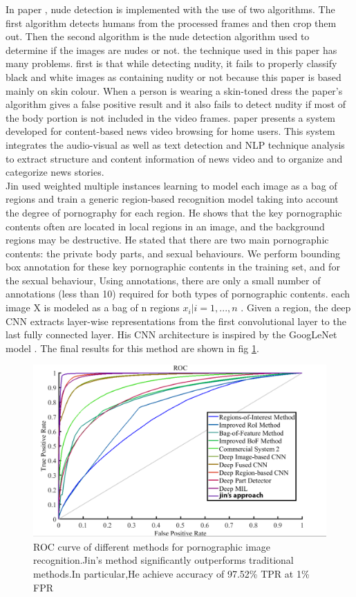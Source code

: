 \documentclass[runningheads]{llncs}
\begin{document}
In paper \cite{tofa2017inappropriate}, nude detection is implemented with the use of two algorithms. The first algorithm detects humans from the processed frames and then crop them out. Then the second algorithm is the nude detection algorithm used to determine if the images are nudes or not. the technique used in this paper has many problems. first is that	while detecting nudity, it fails to properly classify black and white images as containing nudity or not because this paper is based mainly on skin colour. When a person is wearing a skin-toned dress the paper's algorithm gives a false positive result and it also fails to detect nudity if most of the body portion is not included in the video frames. paper \cite{qi2000integrating} presents a system developed for content-based news video browsing for home users. This system integrates the audio-visual as well as text detection and NLP technique analysis to extract structure and content information of news video and to organize and categorize news stories.\\

Jin \cite{jin2018pornographic} used weighted multiple instances learning to model each image as a bag of regions and train a generic region-based recognition model taking into account the degree of pornography for each region. He shows that the key pornographic contents often are located in local regions in an image, and the background regions may be destructive. He stated that there are two main pornographic contents: the private body parts, and sexual behaviours. We perform bounding box annotation for these key pornographic contents in the training set, and for the sexual behaviour, Using annotations, there are only a small number of annotations (less than 10) required for both types of pornographic contents. each image X is modeled as a bag of
n regions $ { x_{i}|i = 1, ... , n } $ . Given a region, the deep CNN extracts layer-wise representations from the first convolutional layer to the last fully connected layer. His CNN architecture is inspired by the GoogLeNet model \cite{szegedy2015going}. The final results for this method are shown in fig \ref{roc_map}. \\

\begin{figure}
\centering
\includegraphics[width=.7\textwidth]{figures/roc.PNG}
\caption{ROC curve of different methods for pornographic image recognition.Jin's method significantly outperforms traditional methods.In particular,He achieve accuracy of 97.52\% TPR at 1\% FPR } \label{roc_map}
\end{figure}
\end{document}
